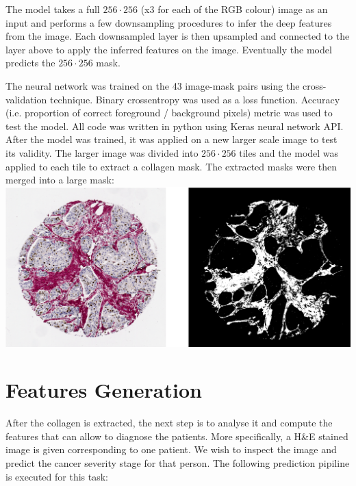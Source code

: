 \documentclass{article}
\begin{document}
The model takes a full $256 \cdot 256$ (x3 for each of the RGB colour)
image as an input and performs a few downsampling procedures to infer the
deep features from the image. Each downsampled layer is then upsampled and
connected to the layer above to apply the inferred features on the image.
Eventually the model predicts the $256 \cdot 256$ mask.

The neural network was trained on the 43 image-mask pairs using the
cross-validation technique. Binary crossentropy was used as a loss function.
Accuracy (i.e. proportion of correct foreground / background pixels) metric
was used to test the model. All code was written in python using Keras
neural network API. After the model was trained, it was applied on a new
larger scale image to test its validity. The larger image was divided
into $256 \cdot 256$ tiles and the model was applied to each tile to extract
a collagen mask. The extracted masks were then merged into a large mask: \\

\includegraphics[width=\textwidth]{images/test.png}

\section{Features Generation}

After the collagen is extracted, the next step is to analyse it and compute
the features that can allow to diagnose the patients. More specifically, a
H\&E stained image is given corresponding to one patient. We wish to
inspect the image and predict the cancer severity stage for that person. The
following prediction pipiline is executed for this task:
\end{document}
